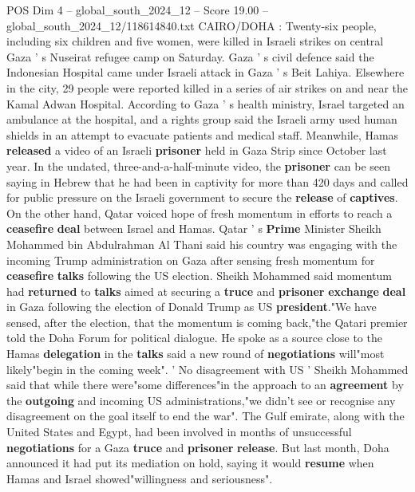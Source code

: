 \begin{textsample}{POS Dim 4 – global\_south\_2024\_12 – Score 19.00 – global\_south\_2024\_12/118614840.txt}  \label{ex:f4_pos_236}
CAIRO/DOHA : Twenty-six people, including six children and five women, were killed in Israeli strikes on central Gaza ' s Nuseirat refugee camp on Saturday.
Gaza ' s civil defence said the Indonesian Hospital came under Israeli attack in Gaza ' s Beit Lahiya.
Elsewhere in the city, 29 people were reported killed in a series of air strikes on and near the Kamal Adwan Hospital.
According to Gaza ' s health ministry, Israel targeted an ambulance at the hospital, and a rights group said the Israeli army used human shields in an attempt to evacuate patients and medical staff.
Meanwhile, Hamas \textbf{released} a video of an Israeli \textbf{prisoner} held in Gaza Strip since October last year.
In the undated, three-and-a-half-minute video, the \textbf{prisoner} can be seen saying in Hebrew that he had been in captivity for more than 420 days and called for public pressure on the Israeli government to secure the \textbf{release} of \textbf{captives}.
On the other hand, Qatar voiced hope of fresh momentum in efforts to reach a \textbf{ceasefire} \textbf{deal} between Israel and Hamas.
Qatar ' s \textbf{Prime} Minister Sheikh Mohammed bin Abdulrahman Al Thani said his country was engaging with the incoming Trump administration on Gaza after sensing fresh momentum for \textbf{ceasefire} \textbf{talks} following the US election.
Sheikh Mohammed said momentum had \textbf{returned} to \textbf{talks} aimed at securing a \textbf{truce} and \textbf{prisoner} \textbf{exchange} \textbf{deal} in Gaza following the election of Donald Trump as US \textbf{president}."We have sensed, after the election, that the momentum is coming back,"the Qatari premier told the Doha Forum for political dialogue.
He spoke as a source close to the Hamas \textbf{delegation} in the \textbf{talks} said a new round of \textbf{negotiations} will"most likely"begin in the coming week". ' No disagreement with US ' Sheikh Mohammed said that while there were"some differences"in the approach to an \textbf{agreement} by the \textbf{outgoing} and incoming US administrations,"we didn't see or recognise any disagreement on the goal itself to end the war".
The Gulf emirate, along with the United States and Egypt, had been involved in months of unsuccessful \textbf{negotiations} for a Gaza \textbf{truce} and \textbf{prisoner} \textbf{release}.
But last month, Doha announced it had put its mediation on hold, saying it would \textbf{resume} when Hamas and Israel showed"willingness and seriousness".

\end{textsample}
